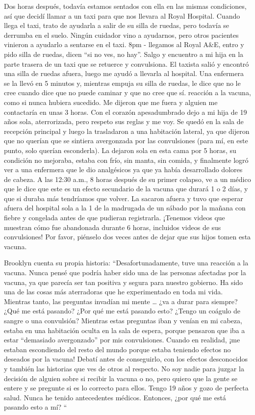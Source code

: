 Dos horas después, todavía estamos sentados con ella en las mismas condiciones,
así que decidí llamar a un taxi para que nos llevara al Royal Hospital. Cuando
llega el taxi, trato de ayudarla a salir de su silla de ruedas, pero todavía se
derrumba en el suelo. Ningún cuidador vino a ayudarnos, pero otros pacientes
vinieron a ayudarlo a sentarse en el taxi. 8pm - llegamos al Royal A\&E, entro y
pido silla de ruedas, dicen “si no ves, no hay”. Salgo y encuentro a mi hija en
la parte trasera de un taxi que se retuerce y convulsiona. El taxista salió y
encontró una silla de ruedas afuera, luego me ayudó a llevarla al hospital. Una
enfermera se la llevó en 5 minutos y, mientras empuja su silla de ruedas, le
dice que no le cree cuando dice que no puede caminar y que no cree que
sí. reacción a la vacuna, como si nunca hubiera sucedido. Me dijeron que me
fuera y alguien me contactaría en unas 3 horas. Con el corazón apesadumbrado
dejo a mi hija de 19 años sola, aterrorizada, pero respeto sus reglas y me
voy. Se quedó en la sala de recepción principal y luego la trasladaron a una
habitación lateral, ya que dijeron que no querían que se sintiera avergonzada
por las convulsiones (para mí, en este punto, solo querían esconderla). La
dejaron sola en esta cama por 5 horas, su condición no mejoraba, estaba con
frío, sin manta, sin comida, y finalmente logró ver a una enfermera que le dio
analgésicos ya que ya había desarrollado dolores de cabeza. A las 12:30 a.m., 8
horas después de su primer colapso, ve a un médico que le dice que este es un
efecto secundario de la vacuna que durará 1 o 2 días, y que si duraba más
tendríamos que volver. La sacaron afuera y tuvo que esperar afuera del hospital
sola a la 1 de la madrugada de un sábado por la mañana con fiebre y congelada
antes de que pudieran registrarla. ¡Tenemos videos que muestran cómo fue
abandonada durante 6 horas, incluidos videos de sus convulsiones! Por favor,
piénselo dos veces antes de dejar que sus hijos tomen esta vacuna.

Brooklyn cuenta su propia historia: “Desafortunadamente, tuve una reacción a la
vacuna. Nunca pensé que podría haber sido una de las personas afectadas por la
vacuna, ya que parecía ser tan positiva y segura para nuestro gobierno. Ha sido
una de las cosas más aterradoras que he experimentado en toda mi vida. Mientras
tanto, las preguntas invadían mi mente … ¿va a durar para siempre? ¿Qué me está
pasando? ¿Por qué me está pasando esto? ¿Tengo un coágulo de sangre o una
convulsión? Mientras estas preguntas iban y venían en mi cabeza, estaba en una
habitación oculta en la sala de espera, porque pensaron que iba a estar
“demasiado avergonzado” por mis convulsiones. Cuando en realidad, ¡me estaban
escondiendo del resto del mundo porque estaba teniendo efectos no deseados por
la vacuna! Debatí antes de conseguirlo, con los efectos desconocidos y también
las historias que ves de otros al respecto. No soy nadie para juzgar la decisión
de alguien sobre si recibir la vacuna o no, pero quiero que la gente se entere y
se pregunte si es lo correcto para ellos. Tengo 19 años y gozo de perfecta
salud. Nunca he tenido antecedentes médicos. Entonces, ¿por qué me está pasando
esto a mí? “

